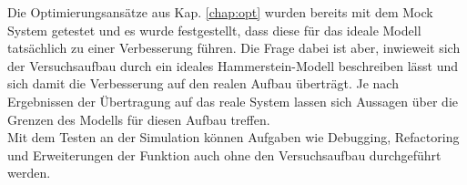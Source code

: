 \documentclass[../Report.tex]{subfiles}
\begin{document}
Die Optimierungsansätze aus Kap. \ref{chap:opt} wurden bereits mit dem Mock System getestet und es wurde festgestellt, dass diese für das ideale Modell tatsächlich zu einer Verbesserung führen. Die Frage dabei ist aber, inwieweit sich der Versuchsaufbau durch ein ideales Hammerstein-Modell beschreiben lässt und sich damit die Verbesserung auf den realen Aufbau überträgt. Je nach Ergebnissen der Übertragung auf das reale System lassen sich Aussagen über die Grenzen des Modells für diesen Aufbau treffen.\\
Mit dem Testen an der Simulation können Aufgaben wie Debugging, Refactoring und Erweiterungen der Funktion auch ohne den Versuchsaufbau durchgeführt werden.
\end{document}
